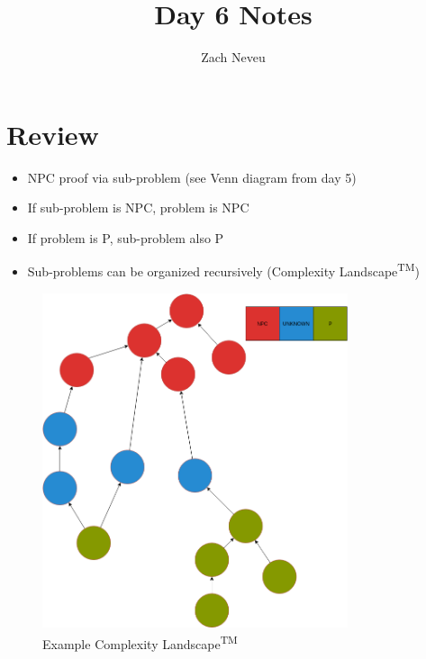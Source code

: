 \documentclass[12pt, letter]{article}
\author{Zach Neveu}
\title{ Day 6 Notes }
\begin{document}
\maketitle

\section{Review}%
\label{sec:review}
\begin{itemize}
	\item NPC proof via sub-problem (see Venn diagram from day 5)
	\item If sub-problem is NPC, problem is NPC
	\item If problem is P, sub-problem also P
	\item Sub-problems can be organized recursively (Complexity Landscape\textsuperscript{TM})
\end{itemize}
\begin{figure}[h]
	\centering
	\includegraphics[width=0.8\textwidth]{complexity-landscape}
	\caption{Example Complexity Landscape\textsuperscript{TM}}
	\label{fig:complexity-landscape}
\end{figure}
\end{document}
